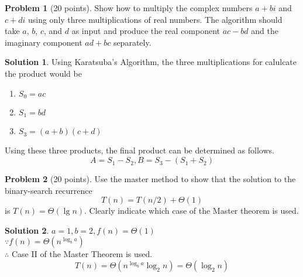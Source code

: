 \documentclass{article}
\theoremstyle{definition}
\newtheorem{problem}{Problem}
\newtheorem*{solution}{Solution}
\begin{document}
\begin{problem}[20 points]
  Show how to multiply the complex numbers $a+bi$ and $c+di$ using
  only three multiplications of real numbers. The algorithm should
  take $a$, $b$, $c$, and $d$ as input and produce the real component
  $ac-bd$ and the imaginary component $ad+bc$ separately.
\end{problem}
\begin{solution}
Using Karatsuba's Algorithm, the three multiplications for calulcate the product would be
\begin{enumerate}
    \item $S_0=ac$
    \item $S_1=bd$
    \item $S_3=(a+b)(c+d)$
\end{enumerate}
Using these three products, the final product can be determined as follows.
\[A=S_1-S_2,B=S_3-(S_1+S_2)\]

\end{solution}

\begin{problem}[20 points]
Use the master method to show that the solution to the binary-search 
recurrence 
$$ T(n) = T(n/2)+\Theta(1)$$
is $T(n) = \Theta(\lg n)$. Clearly indicate which case of the Master
theorem is used.  
\end{problem}
\begin{solution}
$a=1,b=2,f(n)=\Theta(1)$\\
$\because f(n)=\Theta\left(n^{\log_b a}\right)$\\
$\therefore$ Case II of the Master Theorem is used.
\[T(n)=\Theta\left(n^{\log_b a}\log_2 n\right)=\Theta(\log_2 n)\]
\end{solution}
\end{document}

